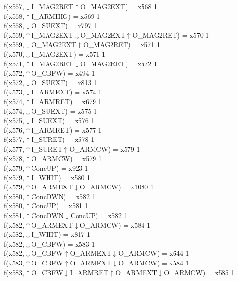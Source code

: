 f(x567,$\downarrow$I\_MAG2RET$\uparrow$O\_MAG2EXT) = x568 {1} \\
f(x568,$\uparrow$I\_ARMHIG) = x569 {1} \\
f(x568,$\downarrow$O\_SUEXT) = x797 {1} \\
f(x569,$\uparrow$I\_MAG2EXT$\downarrow$O\_MAG2EXT$\uparrow$O\_MAG2RET) = x570 {1} \\
f(x569,$\downarrow$O\_MAG2EXT$\uparrow$O\_MAG2RET) = x571 {1} \\
f(x570,$\downarrow$I\_MAG2EXT) = x571 {1} \\
f(x571,$\uparrow$I\_MAG2RET$\downarrow$O\_MAG2RET) = x572 {1} \\
f(x572,$\uparrow$O\_CBFW) = x494 {1} \\
f(x572,$\downarrow$O\_SUEXT) = x813 {1} \\
f(x573,$\downarrow$I\_ARMEXT) = x574 {1} \\
f(x574,$\uparrow$I\_ARMRET) = x679 {1} \\
f(x574,$\downarrow$O\_SUEXT) = x575 {1} \\
f(x575,$\downarrow$I\_SUEXT) = x576 {1} \\
f(x576,$\uparrow$I\_ARMRET) = x577 {1} \\
f(x577,$\uparrow$I\_SURET) = x578 {1} \\
f(x577,$\uparrow$I\_SURET$\uparrow$O\_ARMCW) = x579 {1} \\
f(x578,$\uparrow$O\_ARMCW) = x579 {1} \\
f(x579,$\uparrow$ConcUP) = x923 {1} \\
f(x579,$\uparrow$I\_WHIT) = x580 {1} \\
f(x579,$\uparrow$O\_ARMEXT$\downarrow$O\_ARMCW) = x1080 {1} \\
f(x580,$\uparrow$ConcDWN) = x582 {1} \\
f(x580,$\uparrow$ConcUP) = x581 {1} \\
f(x581,$\uparrow$ConcDWN$\downarrow$ConcUP) = x582 {1} \\
f(x582,$\uparrow$O\_ARMEXT$\downarrow$O\_ARMCW) = x584 {1} \\
f(x582,$\downarrow$I\_WHIT) = x817 {1} \\
f(x582,$\downarrow$O\_CBFW) = x583 {1} \\
f(x582,$\downarrow$O\_CBFW$\uparrow$O\_ARMEXT$\downarrow$O\_ARMCW) = x644 {1} \\
f(x583,$\uparrow$O\_CBFW$\uparrow$O\_ARMEXT$\downarrow$O\_ARMCW) = x584 {1} \\
f(x583,$\uparrow$O\_CBFW$\downarrow$I\_ARMRET$\uparrow$O\_ARMEXT$\downarrow$O\_ARMCW) = x585 {1} \\
